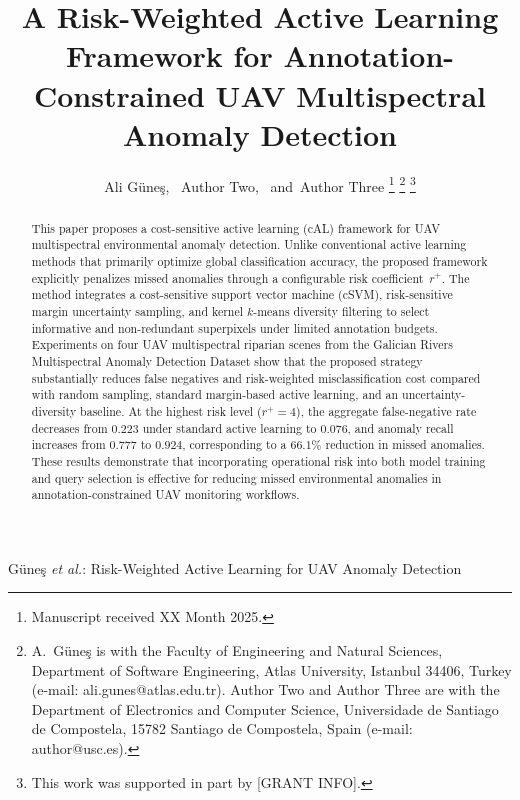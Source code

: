 \documentclass[lettersize,journal]{IEEEtran}
\begin{document}
\title{A Risk-Weighted Active Learning Framework for Annotation-Constrained UAV Multispectral Anomaly Detection}

\author{Ali G{\"u}ne\c{s},~
        Author Two,~
        and~Author Three%
\thanks{Manuscript received XX Month 2025.}%
\thanks{A.~G{\"u}ne\c{s} is with the Faculty of Engineering and
Natural Sciences, Department of Software Engineering, Atlas University,
Istanbul 34406, Turkey (e-mail: ali.gunes@atlas.edu.tr).
Author Two and Author Three are with the Department of Electronics and
Computer Science, Universidade de Santiago de Compostela,
15782 Santiago de Compostela, Spain (e-mail: author@usc.es).}%
\thanks{This work was supported in part by [GRANT INFO].}}

%
{G{\"u}ne\c{s} \MakeLowercase{\textit{et al.}}: Risk-Weighted Active Learning for UAV Anomaly Detection}


\maketitle

\begin{abstract}
This paper proposes a cost-sensitive active learning (cAL) framework
for UAV multispectral environmental anomaly detection. Unlike
conventional active learning methods that primarily optimize global
classification accuracy, the proposed framework explicitly penalizes
missed anomalies through a configurable risk coefficient~$r^{+}$.
The method integrates a cost-sensitive support vector machine (cSVM),
risk-sensitive margin uncertainty sampling, and kernel $k$-means
diversity filtering to select informative and non-redundant
superpixels under limited annotation budgets. Experiments on four
UAV multispectral riparian scenes from the Galician Rivers
Multispectral Anomaly Detection Dataset show that the proposed
strategy substantially reduces false negatives and risk-weighted
misclassification cost compared with random sampling, standard
margin-based active learning, and an uncertainty-diversity baseline.
At the highest risk level ($r^{+}=4$), the aggregate false-negative
rate decreases from $0.223$ under standard active learning to
$0.076$, and anomaly recall increases from $0.777$ to $0.924$,
corresponding to a $66.1\%$ reduction in missed anomalies. These
results demonstrate that incorporating operational risk into both
model training and query selection is effective for reducing missed
environmental anomalies in annotation-constrained UAV monitoring
workflows.
\end{abstract}
\end{document}
